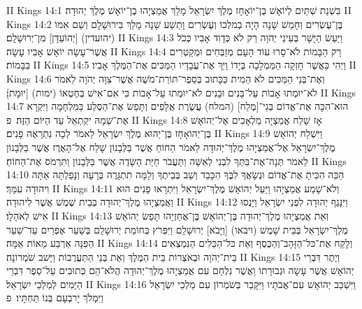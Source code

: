 II Kings 14:1	בִּשְׁנַת שְׁתַּיִם לְיוֹאָשׁ בֶּן־יוֹאָחָז מֶלֶךְ יִשְׂרָאֵל מָלַךְ אֲמַצְיָהוּ בֶן־יוֹאָשׁ מֶלֶךְ יְהוּדָה׃
II Kings 14:2	בֶּן־עֶשְׂרִים וְחָמֵשׁ שָׁנָה הָיָה בְמלְכוֹ וְעֶשְׂרִים וָתֵשַׁע שָׁנָה מָלַךְ בִּירוּשָׁלָ͏ִם וְשֵׁם אִמּוֹ (יהועדין) [יְהוֹעַדָּן] מִן־יְרוּשָׁלָ͏ִם׃
II Kings 14:3	וַיַּעַשׂ הַיָּשָׁר בְּעֵינֵי יְהֹוָה רַק לֹא כְּדָוִד אָבִיו כְּכֹל אֲשֶׁר־עָשָׂה יוֹאָשׁ אָבִיו עָשָׂה׃
II Kings 14:4	רַק הַבָּמוֹת לֹא־סָרוּ עוֹד הָעָם מְזַבְּחִים וּמְקַטְּרִים בַּבָּמוֹת׃
II Kings 14:5	וַיְהִי כַּאֲשֶׁר חָזְקָה הַמַּמְלָכָה בְּיָדוֹ וַיַּךְ אֶת־עֲבָדָיו הַמַּכִּים אֶת־הַמֶּלֶךְ אָבִיו׃
II Kings 14:6	וְאֶת־בְּנֵי הַמַּכִּים לֹא הֵמִית כַּכָּתוּב בְּסֵפֶר־תּוֹרַת־מֹשֶׁה אֲשֶׁר־צִוָּה יְהֹוָה לֵאמֹר לֹא־יוּמְתוּ אָבוֹת עַל־בָּנִים וּבָנִים לֹא־יוּמְתוּ עַל־אָבוֹת כִּי אִם־אִישׁ בְּחֶטְאוֹ (ימות) [יוּמָת]׃
II Kings 14:7	הוּא־הִכָּה אֶת־אֱדוֹם בְּגֵי־[מֶלַח] (המלח) עֲשֶׂרֶת אֲלָפִים וְתָפַשׂ אֶת־הַסֶּלַע בַּמִּלְחָמָה וַיִּקְרָא אֶת־שְׁמָהּ יקְתְאֵל עַד הַיּוֹם הַזֶּה׃ {פ}
II Kings 14:8	אָז שָׁלַח אֲמַצְיָה מַלְאָכִים אֶל־יְהוֹאָשׁ בֶּן־יְהוֹאָחָז בֶּן־יֵהוּא מֶלֶךְ יִשְׂרָאֵל לֵאמֹר לְכָה נִתְרָאֶה פָנִים׃
II Kings 14:9	וַיִּשְׁלַח יְהוֹאָשׁ מֶלֶךְ־יִשְׂרָאֵל אֶל־אֲמַצְיָהוּ מֶלֶךְ־יְהוּדָה לֵאמֹר הַחוֹחַ אֲשֶׁר בַּלְּבָנוֹן שָׁלַח אֶל־הָאֶרֶז אֲשֶׁר בַּלְּבָנוֹן לֵאמֹר תְּנָה־אֶת־בִּתְּךָ לִבְנִי לְאִשָּׁה וַתַּעֲבֹר חַיַּת הַשָּׂדֶה אֲשֶׁר בַּלְּבָנוֹן וַתִּרְמֹס אֶת־הַחוֹחַ׃
II Kings 14:10	הַכֵּה הִכִּיתָ אֶת־אֱדוֹם וּנְשָׂאֲךָ לִבֶּךָ הִכָּבֵד וְשֵׁב בְּבֵיתֶךָ וְלָמָּה תִתְגָּרֶה בְּרָעָה וְנָפַלְתָּה אַתָּה וִיהוּדָה עִמָּךְ׃
II Kings 14:11	וְלֹא־שָׁמַע אֲמַצְיָהוּ וַיַּעַל יְהוֹאָשׁ מֶלֶךְ־יִשְׂרָאֵל וַיִּתְרָאוּ פָנִים הוּא וַאֲמַצְיָהוּ מֶלֶךְ־יְהוּדָה בְּבֵית שֶׁמֶשׁ אֲשֶׁר לִיהוּדָה׃
II Kings 14:12	וַיִּנָּגֶף יְהוּדָה לִפְנֵי יִשְׂרָאֵל וַיָּנֻסוּ אִישׁ לְאֹהָלָו׃
II Kings 14:13	וְאֵת אֲמַצְיָהוּ מֶלֶךְ־יְהוּדָה בֶּן־יְהוֹאָשׁ בֶּן־אֲחַזְיָהוּ תָּפַשׂ יְהוֹאָשׁ מֶלֶךְ־יִשְׂרָאֵל בְּבֵית שָׁמֶשׁ (ויבאו) [וַיָּבֹא] יְרוּשָׁלַ͏ִם וַיִּפְרֹץ בְּחוֹמַת יְרוּשָׁלַ͏ִם בְּשַׁעַר אֶפְרַיִם עַד־שַׁעַר הַפִּנָּה אַרְבַּע מֵאוֹת אַמָּה׃
II Kings 14:14	וְלָקַח אֶת־כּל־הַזָּהָב־וְהַכֶּסֶף וְאֵת כּל־הַכֵּלִים הַנִּמְצְאִים בֵּית־יְהֹוָה וּבְאֹצְרוֹת בֵּית הַמֶּלֶךְ וְאֵת בְּנֵי הַתַּעֲרֻבוֹת וַיָּשׁב שֹׁמְרוֹנָה׃
II Kings 14:15	וְיֶתֶר דִּבְרֵי יְהוֹאָשׁ אֲשֶׁר עָשָׂה וּגְבוּרָתוֹ וַאֲשֶׁר נִלְחַם עִם אֲמַצְיָהוּ מֶלֶךְ־יְהוּדָה הֲלֹא־הֵם כְּתוּבִים עַל־סֵפֶר דִּבְרֵי הַיָּמִים לְמַלְכֵי יִשְׂרָאֵל׃
II Kings 14:16	וַיִּשְׁכַּב יְהוֹאָשׁ עִם־אֲבֹתָיו וַיִּקָּבֵר בְּשֹׁמְרוֹן עִם מַלְכֵי יִשְׂרָאֵל וַיִּמְלֹךְ יָרבְעָם בְּנוֹ תַּחְתָּיו׃ {פ}
